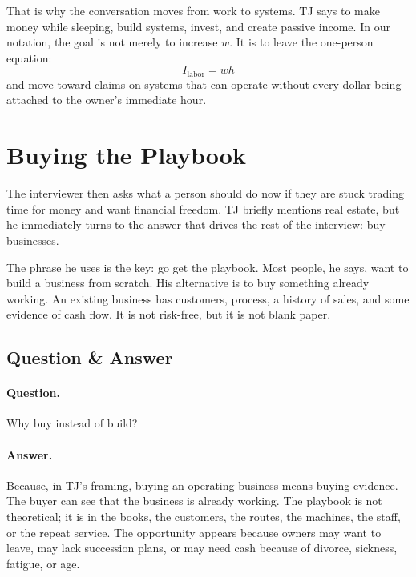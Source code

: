 That is why the conversation moves from work to systems. TJ says to make money while sleeping, build systems, invest, and create passive income. In our notation, the goal is not merely to increase \(w\). It is to leave the one-person equation:
\begin{equation}
I_{\mathrm{labor}} = w h
\end{equation}
and move toward claims on systems that can operate without every dollar being attached to the owner's immediate hour.

\section{Buying the Playbook}

The interviewer then asks what a person should do now if they are stuck trading time for money and want financial freedom. TJ briefly mentions real estate, but he immediately turns to the answer that drives the rest of the interview: buy businesses.

The phrase he uses is the key: go get the playbook. Most people, he says, want to build a business from scratch. His alternative is to buy something already working. An existing business has customers, process, a history of sales, and some evidence of cash flow. It is not risk-free, but it is not blank paper.

\subsection{Question \& Answer}

\paragraph{Question.} Why buy instead of build?

\paragraph{Answer.} Because, in TJ's framing, buying an operating business means buying evidence. The buyer can see that the business is already working. The playbook is not theoretical; it is in the books, the customers, the routes, the machines, the staff, or the repeat service. The opportunity appears because owners may want to leave, may lack succession plans, or may need cash because of divorce, sickness, fatigue, or age.

